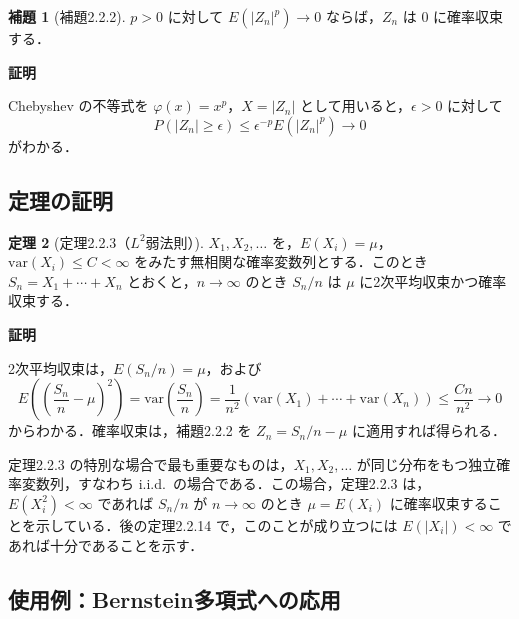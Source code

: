 \documentclass[dvipdfmx]{jsarticle}
\makeatletter
\numberwithin{equation}{section}
\theoremstyle{definition}
\newtheorem{thm}{定理}[section]
\newtheorem{lem}[thm]{補題}
\renewenvironment{proof}[1][\proofname]{\par
  \pushQED{\qed}%
  \normalfont \topsep6\p@\@plus6\p@\relax
  \trivlist
  \item\relax
  {\bfseries
  #1\@addpunct{.}}\hspace\labelsep\ignorespaces
}{%
  \popQED\endtrivlist\@endpefalse
}
\renewcommand{\proofname}{証明}
\newcommand{\0}{\bm{0}}
\newcommand{\1}{\bm{1}}
\makeatother
\begin{document}
\begin{lem}[補題2.2.2]
$p > 0$ に対して $E(|Z_n|^p) \to 0$ ならば，$Z_n$ は $0$ に確率収束する．
\end{lem}

\begin{proof}
Chebyshev の不等式を $\varphi(x) = x^p$，$X = |Z_n|$ として用いると，$\epsilon > 0$ に対して
\[
  P(|Z_n| \ge \epsilon) \le \epsilon^{-p} E(|Z_n|^p) \to 0
\]
がわかる．
\end{proof}

\subsection{定理の証明}

\begin{thm}[定理2.2.3（$L^2$弱法則）]
$X_1, X_2, \dots$ を，$E(X_i) = \mu$，$\mathrm{var}(X_i) \le C < \infty$ をみたす無相関な確率変数列とする．このとき $S_n = X_1 + \cdots + X_n$ とおくと，$n \to \infty$ のとき $S_n/n$ は $\mu$ に2次平均収束かつ確率収束する．
\end{thm}

\begin{proof}
2次平均収束は，$E(S_n/n) = \mu$，および
\[
  E\!\left(\left(\frac{S_n}{n} - \mu\right)^2\right)
  = \mathrm{var}\!\left(\frac{S_n}{n}\right)
  = \frac{1}{n^2}\left(\mathrm{var}(X_1) + \cdots + \mathrm{var}(X_n)\right)
  \le \frac{Cn}{n^2} \to 0
\]
からわかる．確率収束は，補題2.2.2 を $Z_n = S_n/n - \mu$ に適用すれば得られる．
\end{proof}

定理2.2.3 の特別な場合で最も重要なものは，$X_1, X_2, \dots$ が同じ分布をもつ独立確率変数列，すなわち i.i.d.\ の場合である．この場合，定理2.2.3 は，$E(X_i^2) < \infty$ であれば $S_n/n$ が $n \to \infty$ のとき $\mu = E(X_i)$ に確率収束することを示している．後の定理2.2.14 で，このことが成り立つには $E(|X_i|) < \infty$ であれば十分であることを示す．

\subsection{使用例：Bernstein多項式への応用}
\end{document}
